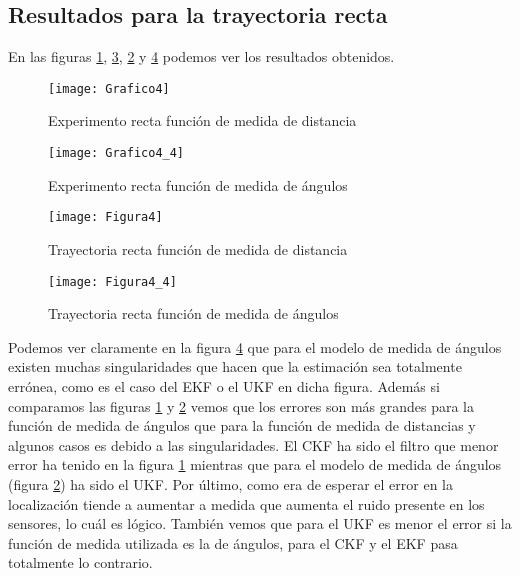 \subsection{Resultados para la trayectoria recta}
En las figuras \ref{Grafico4}, \ref{Figura4}, \ref{Grafico4_4} y \ref{Figura4_4} podemos ver los resultados obtenidos.
\begin{figure}[ht!]
\centering
\texttt{[image: Grafico4]}
\caption{Experimento recta función de medida de distancia} \label{Grafico4}
\end{figure}
\begin{figure}[ht!]
\centering
\texttt{[image: Grafico4\_4]}
\caption{Experimento recta función de medida de ángulos} \label{Grafico4_4}
\end{figure}
\begin{figure}[ht!]
\centering
\texttt{[image: Figura4]}
\caption{Trayectoria recta función de medida de distancia} \label{Figura4}
\end{figure}

\begin{figure}[ht!]
\texttt{[image: Figura4\_4]}
\caption{Trayectoria recta función de medida de ángulos} \label{Figura4_4}
\end{figure}
Podemos ver claramente en la figura \ref{Figura4_4} que para el modelo de medida de ángulos existen muchas singularidades que hacen que la estimación sea totalmente errónea, como es el caso del \ac{EKF} o el \ac{UKF} en dicha figura.
Además si comparamos las figuras \ref{Grafico4} y \ref{Grafico4_4} vemos que los errores son más grandes para la función de medida de ángulos que para la función de medida de distancias y algunos casos es debido a las singularidades.
El \ac{CKF} ha sido el filtro que menor error ha tenido en la figura \ref{Grafico4} mientras que para el modelo de medida de ángulos (figura \ref{Grafico4_4}) ha sido el \ac{UKF}.
Por último, como era de esperar el error en la localización tiende a aumentar a medida que aumenta el ruido presente en los sensores, lo cuál es lógico.
También vemos que para el \ac{UKF} es menor el error si la función de medida utilizada es la de ángulos, para el \ac{CKF} y el \ac{EKF} pasa totalmente lo contrario.

